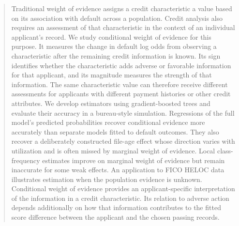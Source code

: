 \begin{abstract}
Traditional weight of evidence assigns a credit characteristic a value based on its association with default across a population. Credit analysis also requires an assessment of that characteristic in the context of an individual applicant's record. We study conditional weight of evidence for this purpose. It measures the change in default log odds from observing a characteristic after the remaining credit information is known. Its sign identifies whether the characteristic adds adverse or favorable information for that applicant, and its magnitude measures the strength of that information. The same characteristic value can therefore receive different assessments for applicants with different payment histories or other credit attributes. We develop estimators using gradient-boosted trees and evaluate their accuracy in a bureau-style simulation. Regressions of the full model's predicted probabilities recover conditional evidence more accurately than separate models fitted to default outcomes. They also recover a deliberately constructed file-age effect whose direction varies with utilization and is often missed by marginal weight of evidence. Local class-frequency estimates improve on marginal weight of evidence but remain inaccurate for some weak effects. An application to FICO HELOC data illustrates estimation when the population evidence is unknown. Conditional weight of evidence provides an applicant-specific interpretation of the information in a credit characteristic. Its relation to adverse action depends additionally on how that information contributes to the fitted score difference between the applicant and the chosen passing records.
\end{abstract}
